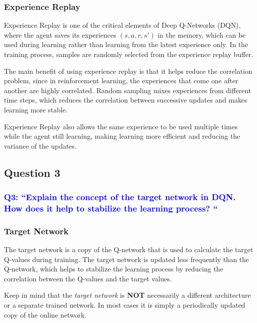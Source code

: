 \documentclass{scrartcl}
\theoremstyle{mytheoremstyle}
\theoremstyle{mytheoremstyle}
\theoremstyle{myproblemstyle}
\begin{document}
\subsubsection*{Experience Replay}

Experience Replay is one of the critical elements of  Deep Q-Networks (DQN),  where the agent saves its experiences  $(s, a, r, s')$ in the memory, which can be used during learning rather than learning from the latest experience only. In the training process, samples are randomly selected from the experience replay buffer.

The main benefit of using experience replay is that it helps reduce the correlation problem,  since in reinforcement learning, the experiences that come one after another are highly correlated. Random sampling mixes experiences from different time steps, which reduces the correlation between successive updates and makes learning more stable.

Experience Replay also allows the same experience to be used multiple times while the agent still learning, making learning more efficient and reducing the variance of the updates.

\newpage

\subsection{Question 3}

\subsubsection*{\textcolor{blue}{Q3: ``Explain the concept of the target network in DQN. How does it help to stabilize the learning process? ``}}

\subsubsection{Target Network}

The target network is a copy of the Q-network that is used to calculate the target Q-values during training. The target network is updated less frequently than the Q-network, which helps to stabilize the learning process by reducing the correlation between the Q-values and the target values.

Keep in mind that the \textit{target network} is \textbf{NOT} necessarily a different architecture or a separate trained network. In most cases it is simply a periodically updated copy of the online network.
\end{document}
